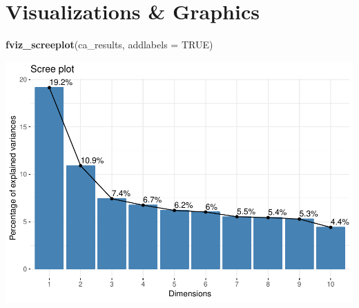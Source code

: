 \documentclass[]{article}
\newenvironment{Shaded}{\begin{snugshade}}{\end{snugshade}}
\newcommand{\DataTypeTok}[1]{\textcolor[rgb]{0.13,0.29,0.53}{#1}}
\newcommand{\KeywordTok}[1]{\textcolor[rgb]{0.13,0.29,0.53}{\textbf{#1}}}
\newcommand{\NormalTok}[1]{#1}
\newcommand{\OtherTok}[1]{\textcolor[rgb]{0.56,0.35,0.01}{#1}}
\begin{document}
\hypertarget{visualizations-graphics}{%
\section{Visualizations \& Graphics}\label{visualizations-graphics}}

\begin{Shaded}
\begin{Highlighting}[]
\KeywordTok{fviz_screeplot}\NormalTok{(ca_results, }\DataTypeTok{addlabels =} \OtherTok{TRUE}\NormalTok{)}
\end{Highlighting}
\end{Shaded}

\includegraphics{1_a_Simple_RMarkdown_PDF_files/figure-latex/visualize_ca_scree-1.pdf}
\end{document}
